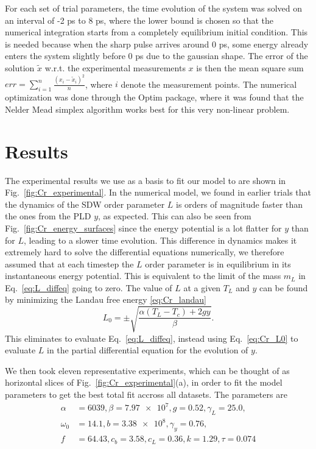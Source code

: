 For each set of trial parameters, the time evolution of the system was solved on an interval of -2 ps to 8 ps, where the lower bound is chosen so that the numerical integration starts from a completely equilibrium initial condition. This is needed because when the sharp pulse arrives around 0 ps, some energy already enters the system slightly before 0 ps due to the gaussian shape.
The error of the solution $\tilde{x}$ w.r.t. the experimental measurements $x$ is then the mean square sum $err = \sum_{i=1}^n \frac{(x_i - \tilde{x}_i)^2}{n}$, where $i$ denote the measurement points.
The numerical optimization was done through the Optim package, where it was found that the Nelder Mead simplex algorithm  works best for this very non-linear problem.

\section{Results}
The experimental results we use as a basis to fit our model to are shown in Fig.~\ref{fig:Cr_experimental}. In the numerical model, we found in earlier trials that the dynamics of the SDW order parameter $L$ is orders of magnitude faster than the ones from the PLD $y$, as expected. This can also be seen from Fig.~\ref{fig:Cr_energy_surfaces} since the energy potential is a lot flatter for $y$ than for $L$, leading to a slower time evolution. This difference in dynamics makes it extremely hard to solve the differential equations numerically, we therefore assumed that at each timestep the $L$ order parameter is in equilibrium in its instantaneous energy potential. This is equivalent to the limit of the mass $m_L$ in Eq.~\ref{eq:L_diffeq} going to zero.
The value of $L$ at a given $T_L$ and $y$ can be found by minimizing the Landau free energy \ref{eq:Cr_landau} 
\begin{equation}
	\label{eq:Cr_L0}
	L_0 = \pm \sqrt{\frac{\alpha (T_L - T_c) + 2 g y}{\beta}}.
\end{equation}
This eliminates to evaluate Eq.~\ref{eq:L_diffeq}, instead using Eq.~\ref{eq:Cr_L0} to evaluate $L$ in the partial differential equation for the evolution of $y$.

We then took eleven representative experiments, which can be thought of as horizontal slices of Fig.~\ref{fig:Cr_experimental}(a), in order to fit the model parameters to get the best total fit accross all datasets. The parameters are
\begin{align}
	\alpha &= 6039, \beta = \SI{7.97e7}, g = 0.52, \gamma_L = 25.0, \\
	\omega_0 &= 14.1, b = \SI{3.38e8}, \gamma_y = 0.76,\\
	f &= 64.43, c_b = 3.58, c_L = 0.36, k = 1.29, \tau = 0.074
\end{align}

